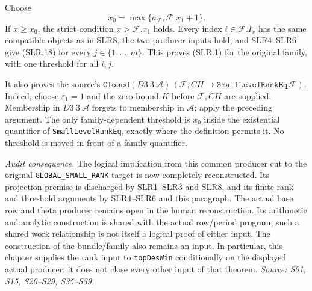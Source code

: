 Choose
\[
              x_0=\max\{a_{\mathcal F},\mathcal F.x_1+1\}.
                                                               \tag{SLR.22}
\]
If $x\ge x_0$, the strict condition $x>\mathcal F.x_1$ holds.
Every index $i\in\mathcal F.I_x$ has the same compatible objects
as in SLR8, the two producer inputs hold, and SLR4--SLR6 give
(SLR.18) for every $j\in\{1,\ldots,m\}$.  This proves (SLR.1) for
the original family, with one threshold for all $i,j$.

It also proves the source's
$\texttt{Closed}(D3\ 3\ \mathcal A)\,
(\mathcal F,CH\mapsto\texttt{SmallLevelRankEq}\,\mathcal F)$.
Indeed, choose $\varepsilon_1=1$ and the zero bound $K$ before
$\mathcal F,CH$ are supplied.  Membership in $D3\ 3\ \mathcal A$
forgets to membership in $\mathcal A$; apply the preceding argument.
The only family-dependent threshold is $x_0$ inside the existential
quantifier of \texttt{SmallLevelRankEq}, exactly where the definition
permits it.  No threshold is moved in front of a family quantifier.

\emph{Audit consequence.}  The logical implication from this common
producer cut to the original \texttt{GLOBAL\_SMALL\_RANK} target is
now completely reconstructed.  Its projection premise is discharged
by SLR1--SLR3 and SLR8, and its finite rank and threshold arguments by
SLR4--SLR6 and this paragraph.  The actual base row and theta producer
remains open in the human reconstruction.  Its arithmetic and analytic
construction is shared with the actual row/period program; such a
shared work relationship is not itself a logical proof of either
input.  The construction of the bundle/family also remains an input.
In particular, this chapter supplies the rank input to
\texttt{topDesWin} conditionally on the displayed actual producer;
it does not close every other input of that theorem.
\emph{Source: S01, S15, S20--S29, S35--S39.}
